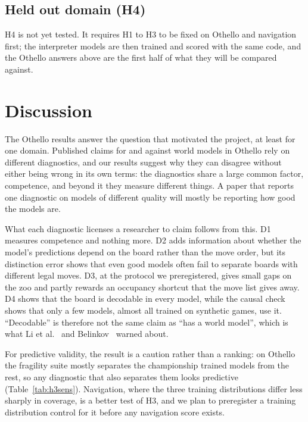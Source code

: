 \documentclass[11pt]{scrartcl}
\begin{document}
\subsection{Held out domain (H4)}
H4 is not yet tested. It requires H1 to H3 to be fixed on Othello and navigation first; the interpreter models
are then trained and scored with the same code, and the Othello answers above are the first half of what they
will be compared against.

\section{Discussion}

The Othello results answer the question that motivated the project, at least for one domain. Published claims
for and against world models in Othello rely on different diagnostics, and our results suggest why they can
disagree without either being wrong in its own terms: the diagnostics share a large common factor, competence,
and beyond it they measure different things. A paper that reports one diagnostic on models of different quality
will mostly be reporting how good the models are.

What each diagnostic licenses a researcher to claim follows from this. D1 measures competence and nothing
more. D2 adds information about whether the model's predictions depend on the board rather than the move order,
but its distinction error shows that even good models often fail to separate boards with different legal moves.
D3, at the protocol we preregistered, gives small gaps on the zoo and partly rewards an occupancy shortcut that
the move list gives away. D4 shows that the board is decodable in every model, while the causal check shows
that only a few models, almost all trained on synthetic games, use it. ``Decodable'' is therefore not the same
claim as ``has a world model'', which is what Li et al.~\cite{li2023othello} and Belinkov~\cite{belinkov2022probing}
warned about.

For predictive validity, the result is a caution rather than a ranking: on Othello the fragility suite mostly
separates the championship trained models from the rest, so any diagnostic that also separates them looks
predictive (Table~\ref{tab:h3sens}). Navigation, where the three training distributions differ less sharply in coverage, is a better
test of H3, and we plan to preregister a training distribution control for it before any navigation score
exists.
\end{document}
